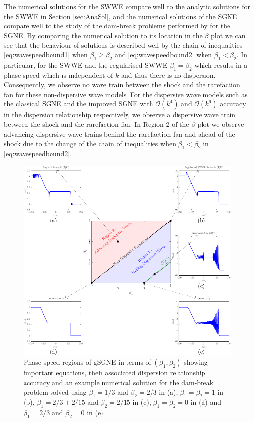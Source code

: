 \documentclass[10pt]{elsarticle}
\begin{document}
The numerical solutions for the SWWE compare well to the analytic solutions for the SWWE in Section \ref{sec:AnaSol}, and the numerical solutions of the SGNE compare well to the study of the dam-break problems performed by \citet{Pitt-2018-61} for the SGNE. By comparing the numerical solution to its location in the $\beta$ plot we can see that the behaviour of solutions is described well by the chain of inequalities \eqref{eq:wavespeedbound1} when $\beta_1 \ge \beta_2$ and \eqref{eq:wavespeedbound2} when $\beta_1 < \beta_2$. In particular, for the SWWE and the regularised SWWE $\beta_1 = \beta_2$ which results in a phase speed which is independent of $k$ and thus there is no dispersion. Consequently, we observe no wave train between the shock and the rarefaction fan for these non-dispersive wave models. For the dispersive wave models such as the classical SGNE and the improved SGNE with $\mathcal{O}(k^4)$ and $\mathcal{O}(k^6)$ accuracy in the dispersion relationship respectively, we observe a dispersive wave train between the shock and the rarefaction fan. In Region 2 of the $\beta$ plot we observe advancing dispersive wave trains behind the rarefaction fan and ahead of the shock due to the change of the chain of inequalities when $\beta_1 < \beta_2$ in \eqref{eq:wavespeedbound2}. 
\begin{figure}
	\centering
	\includegraphics[width=\textwidth]{Figure-1abcde.pdf}
	\caption{Phase speed regions of gSGNE in terms of $\left(\beta_1,\beta_2\right)$ showing important equations, their associated dispersion relationship accuracy and an example numerical solution for the dam-break problem solved using $\beta_1 = 1/3$ and $\beta_2 = 2/3$ in (a), $\beta_1 = \beta_2 = 1$ in (b), $\beta_1 = 2/3 + 2/15$ and $\beta_2 = 2/15$ in (c), $\beta_1 = \beta_2 = 0$ in (d) and $\beta_1 = 2/3$ and $\beta_2 = 0$ in (e).  }
	\label{Fig:WaveSpeedRegGrid}
\end{figure}
\end{document}
